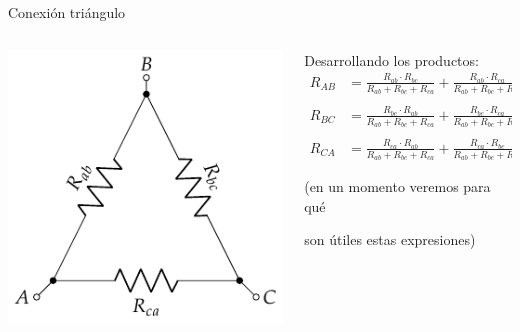 \documentclass[aspectratio=169, xcolor={usenames,svgnames,dvipsnames}]{beamer}
\begin{document}

\begin{frame}{Conexión triángulo}
    \begin{columns}
    \begin{column}{0.4\columnwidth}
    \begin{center}
    \includegraphics[width=1.1\linewidth]{../figs/Conexion_Triangulo.pdf}
    \end{center}
    \end{column}
    \begin{column}{0.5\columnwidth}
    Desarrollando los productos:
    \begin{align*}
      R_{AB} &= \frac{R_{ab} \cdot R_{bc}}{R_{ab} + R_{bc} + R_{ca}} + \frac{R_{ab} \cdot R_{ca}}{R_{ab} + R_{bc} + R_{ca}}\\
      \\
      R_{BC} &= \frac{R_{bc} \cdot R_{ab}}{R_{ab} + R_{bc} + R_{ca}} + \frac{R_{bc} \cdot R_{ca}}{R_{ab} + R_{bc} + R_{ca}}\\
      \\
      R_{CA} &= \frac{R_{ca} \cdot R_{ab}}{R_{ab} + R_{bc} + R_{ca}} + \frac{R_{ca} \cdot R_{bc}}{R_{ab} + R_{bc} + R_{ca}}
    \end{align*}
    
    \vspace*{3mm}
    \centering \small{(en un momento veremos para qué 
    
    son útiles estas expresiones)}
    \end{column}
    \end{columns}
\end{frame}
\end{document}
